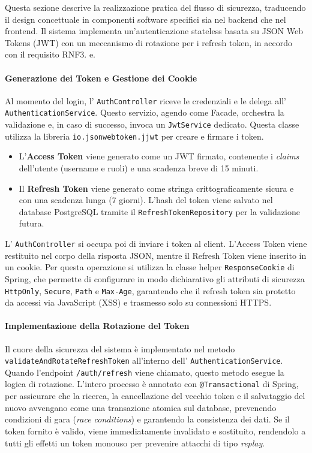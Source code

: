 \documentclass[12pt,a4paper,openright,twoside]{book}
\begin{document}
Questa sezione descrive la realizzazione pratica del flusso di sicurezza, traducendo il design concettuale in componenti software specifici sia nel backend che nel frontend. Il sistema implementa un'autenticazione stateless basata su JSON Web Tokens (JWT) con un meccanismo di rotazione per i refresh token, in accordo con il requisito RNF3.
e.

\paragraph{Generazione dei Token e Gestione dei Cookie}
Al momento del login, l' \texttt{Auth\allowbreak Controller} riceve le credenziali e le delega all' \texttt{Authentication\allowbreak Service}. Questo servizio, agendo come Facade, orchestra la validazione e, in caso di successo, invoca un \texttt{Jwt\allowbreak Service} dedicato. Questa classe utilizza la libreria \texttt{io.\allowbreak jsonwebtoken.\allowbreak jjwt} per creare e firmare i token.
\begin{itemize}
    \item L'\textbf{Access Token} viene generato come un JWT firmato, contenente i \textit{claims} dell'utente (username e ruoli) e una scadenza breve di 15 minuti.
    \item Il \textbf{Refresh Token} viene generato come stringa crittograficamente sicura e con una scadenza lunga (7 giorni). L'hash del token viene salvato nel database PostgreSQL tramite il \texttt{RefreshTokenRepository} per la validazione futura.
\end{itemize}
L' \texttt{AuthController} si occupa poi di inviare i token al client. L'Access Token viene restituito nel corpo della risposta JSON, mentre il Refresh Token viene inserito in un cookie. Per questa operazione si utilizza la classe helper \texttt{ResponseCookie} di Spring, che permette di configurare in modo dichiarativo gli attributi di sicurezza \texttt{HttpOnly}, \texttt{Secure}, \texttt{Path} e \texttt{Max-Age}, garantendo che il refresh token sia protetto da accessi via JavaScript (XSS) e trasmesso solo su connessioni HTTPS.

\paragraph{Implementazione della Rotazione del Token}
Il cuore della sicurezza del sistema è implementato nel metodo \texttt{validateAndRotateRefreshToken} all'interno dell' \texttt{AuthenticationService}. Quando l'endpoint \texttt{/auth/refresh} viene chiamato, questo metodo esegue la logica di rotazione. L'intero processo è annotato con \texttt{@Transactional} di Spring, per assicurare che la ricerca, la cancellazione del vecchio token e il salvataggio del nuovo avvengano come una transazione atomica sul database, prevenendo condizioni di gara (\textit{race conditions}) e garantendo la consistenza dei dati. Se il token fornito è valido, viene immediatamente invalidato e sostituito, rendendolo a tutti gli effetti un token monouso per prevenire attacchi di tipo \textit{replay}.
\end{document}
